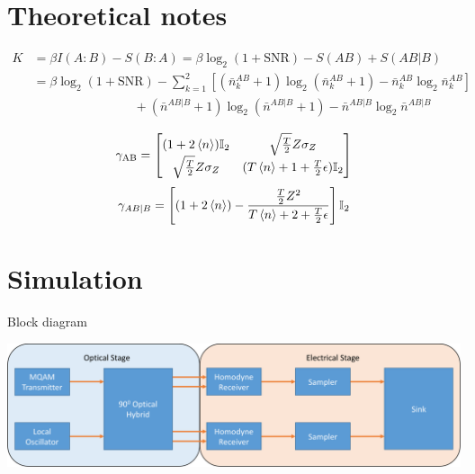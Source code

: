\documentclass{beamer}
\begin{document}
\section{Theoretical notes}
\begin{frame}[t]
\begin{align*}
K&=\beta I(A:B)-S(B:A) = \beta\log_2(1+\text{SNR})-S(AB)+S(AB|B)\\
&=\beta\log_2(1+\text{SNR}) -\sum_{k=1}^2\left[(\bar{n}_k^{AB}+1)\log_2(\bar{n}_k^{AB}+1)-\bar{n}_k^{AB}\log_2\bar{n}_k^{AB}\right]\\
&\qquad {} \qquad {}  \qquad {} \qquad {}   +(\bar{n}^{AB|B}+1)\log_2(\bar{n}^{AB|B}+1)-\bar{n}^{AB|B}\log_2\bar{n}^{AB|B}
\end{align*}
\end{frame}

\begin{frame}[t]
\begin{align*}
\gamma_\text{AB}=\left[
\begin{matrix}
(1+2\braket{n})\mathbb{I}_2 & \sqrt{\frac{T}{2}}Z\sigma_Z \\
\sqrt{\frac{T}{2}}Z\sigma_Z & (T\braket{n}+1+\frac{T}{2}\epsilon)\mathbb{I}_2
\end{matrix}
\right]
\end{align*}
\begin{align*}
\gamma_{AB|B}=\left[(1+2\braket{n})-\frac{\frac{T}{2}Z^2}{T\braket{n}+2+\frac{T}{2}\epsilon}\right]\mathbb{I}_2
\end{align*}
\end{frame}

\section{Simulation}
\begin{frame}[t]{Block diagram}
\begin{center}
\includegraphics[width=\linewidth]{blockdiagramsimulation.png}
\end{center}
\end{frame}
\end{document}
